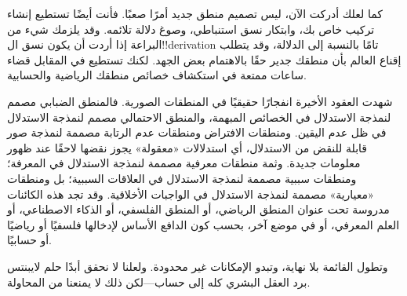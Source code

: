 \documentclass[../../../include/open-logic-section]{subfiles}
\begin{document}


كما لعلك أدركت الآن، ليس تصميم منطق جديد أمرًا صعبًا. فأنت أيضًا
تستطيع إنشاء تركيب خاص بك، وابتكار نسق استنباطي، وصوغ دلالة تلائمه.
وقد يلزمك شيء من البراعة إذا أردت أن يكون نسق ال!!{derivation} تامًا
بالنسبة إلى الدلالة، وقد يتطلب إقناع العالم بأن منطقك جدير حقًا
بالاهتمام بعض الجهد. لكنك تستطيع في المقابل قضاء ساعات ممتعة في
استكشاف خصائص منطقك الرياضية والحسابية.

شهدت العقود الأخيرة انفجارًا حقيقيًا في المنطقات الصورية. فالمنطق
الضبابي مصمم لنمذجة الاستدلال في الخصائص المبهمة، والمنطق الاحتمالي
مصمم لنمذجة الاستدلال في ظل عدم اليقين. ومنطقات الافتراض ومنطقات عدم
الرتابة مصممة لنمذجة صور قابلة للنقض من الاستدلال، أي استدلالات
«معقولة» يجوز نقضها لاحقًا عند ظهور معلومات جديدة. وثمة منطقات معرفية
مصممة لنمذجة الاستدلال في المعرفة؛ ومنطقات سببية مصممة لنمذجة
الاستدلال في العلاقات السببية؛ بل ومنطقات «معيارية» مصممة لنمذجة
الاستدلال في الواجبات الأخلاقية. وقد تجد هذه الكائنات مدروسة تحت عنوان
المنطق الرياضي، أو المنطق الفلسفي، أو الذكاء الاصطناعي، أو العلم
المعرفي، أو في موضع آخر، بحسب كون الدافع الأساس لإدخالها فلسفيًا أو
رياضيًا أو حسابيًا.

وتطول القائمة بلا نهاية، وتبدو الإمكانات غير محدودة. ولعلنا لا نحقق
أبدًا حلم لايبنتس برد العقل البشري كله إلى حساب---لكن ذلك لا يمنعنا
من المحاولة.
\end{document}
